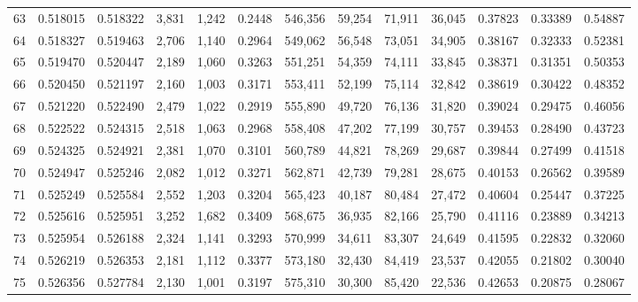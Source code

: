 \begin{tabular}{rrrrrrrrrrrrr}
63 &  0.518015 &  0.518322 &   3,831 &  1,242 &                                     0.2448 &  546,356 &   59,254 &   71,911 &   36,045 &  0.37823 &  0.33389 &  0.54887 \\
64 &  0.518327 &  0.519463 &   2,706 &  1,140 &                                     0.2964 &  549,062 &   56,548 &   73,051 &   34,905 &  0.38167 &  0.32333 &  0.52381 \\
65 &  0.519470 &  0.520447 &   2,189 &  1,060 &                                     0.3263 &  551,251 &   54,359 &   74,111 &   33,845 &  0.38371 &  0.31351 &  0.50353 \\
66 &  0.520450 &  0.521197 &   2,160 &  1,003 &                                     0.3171 &  553,411 &   52,199 &   75,114 &   32,842 &  0.38619 &  0.30422 &  0.48352 \\
67 &  0.521220 &  0.522490 &   2,479 &  1,022 &                                     0.2919 &  555,890 &   49,720 &   76,136 &   31,820 &  0.39024 &  0.29475 &  0.46056 \\
68 &  0.522522 &  0.524315 &   2,518 &  1,063 &                                     0.2968 &  558,408 &   47,202 &   77,199 &   30,757 &  0.39453 &  0.28490 &  0.43723 \\
69 &  0.524325 &  0.524921 &   2,381 &  1,070 &                                     0.3101 &  560,789 &   44,821 &   78,269 &   29,687 &  0.39844 &  0.27499 &  0.41518 \\
70 &  0.524947 &  0.525246 &   2,082 &  1,012 &                                     0.3271 &  562,871 &   42,739 &   79,281 &   28,675 &  0.40153 &  0.26562 &  0.39589 \\
71 &  0.525249 &  0.525584 &   2,552 &  1,203 &                                     0.3204 &  565,423 &   40,187 &   80,484 &   27,472 &  0.40604 &  0.25447 &  0.37225 \\
72 &  0.525616 &  0.525951 &   3,252 &  1,682 &                                     0.3409 &  568,675 &   36,935 &   82,166 &   25,790 &  0.41116 &  0.23889 &  0.34213 \\
73 &  0.525954 &  0.526188 &   2,324 &  1,141 &                                     0.3293 &  570,999 &   34,611 &   83,307 &   24,649 &  0.41595 &  0.22832 &  0.32060 \\
74 &  0.526219 &  0.526353 &   2,181 &  1,112 &                                     0.3377 &  573,180 &   32,430 &   84,419 &   23,537 &  0.42055 &  0.21802 &  0.30040 \\
75 &  0.526356 &  0.527784 &   2,130 &  1,001 &                                     0.3197 &  575,310 &   30,300 &   85,420 &   22,536 &  0.42653 &  0.20875 &  0.28067 \\

\end{tabular}
